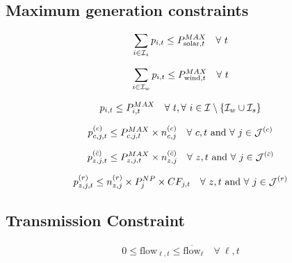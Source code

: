 \documentclass[11pt, oneside]{article}   	%
\newcommand{\flow}{\text{flow}}
\newcommand{\bc}{\bar{c}}
\begin{document}
\subsection{Maximum generation constraints}

\begin{equation} \label{eq:ex_solar}
\begin{split}
\sum_{i \in \mathcal{I}_s} p_{i, t} \le P^{MAX}_{\text{solar}, t} \quad \forall~t
\end{split}
\end{equation}

\begin{equation} \label{eq:ex_wind}
\begin{split}
\sum_{i \in \mathcal{I}_w} p_{i, t} \le P^{MAX}_{\text{wind}, t} \quad \forall~t
\end{split}
\end{equation}

\begin{equation} \label{eq:ex_therm}
\begin{split}
p_{i, t} \le P^{MAX}_{i, t} \quad \forall~t, \forall~i \in \mathcal{I} \setminus \{\mathcal{I}_w \cup \mathcal{I}_s \}
\end{split}
\end{equation}

\begin{equation} \label{eq:new_therm}
\begin{split}
p^{(c)}_{c, j, t} \le P^{MAX}_{c, j, t} \times n^{(c)}_{c, j} \quad \forall~c, t  \text{ and }\forall~j\in \mathcal{J}^{(c)}
\end{split}
\end{equation}

\begin{equation} \label{eq:new_therm2}
\begin{split}
p^{(\bc)}_{z, j, t} \le P^{MAX}_{z, j, t} \times n^{(\bc)}_{z, j} \quad \forall~z, t  \text{ and }\forall~j\in \Jc^{(\bc)}
\end{split}
\end{equation}

\begin{equation} \label{eq:new_ren}
\begin{split}
p^{(r)}_{z, j, t} \le n^{(r)}_{z, j}\times P^{NP}_{j} \times CF_{j, t}  \quad \forall~z, t  \text{ and }\forall~j\in \mathcal{J}^{(r)}
\end{split}
\end{equation}

\subsection{Transmission Constraint}

\begin{equation} \label{eq:trans}
\begin{split}
0 \le \flow_{\ell, t} \le   \overline{\flow}_{\ell} \quad \forall~\ell, t
\end{split}
\end{equation}
\end{document}
